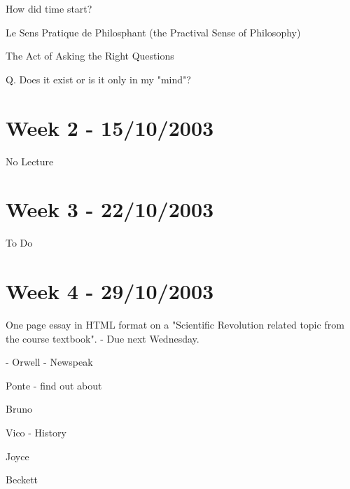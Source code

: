 \documentclass[a4paper,12pt]{article}
\begin{document}
\noindent How did time start?

\vspace{10mm}

\noindent Le Sens Pratique de Philosphant (the Practival Sense of Philosophy)

\vspace{10mm}

\noindent The Act of Asking the Right Questions

\vspace{15mm}

\noindent Q. Does it exist or is it only in my "mind"?

\section*{Week 2 - 15/10/2003}

No Lecture

\section*{Week 3 - 22/10/2003}

\noindent To Do

\section*{Week 4 - 29/10/2003}

\noindent One page essay in HTML format on a "Scientific Revolution related topic
from the course textbook". - Due next Wednesday.

\vspace{10mm}

 - Orwell - Newspeak

\vspace{10mm}

\noindent Ponte - find out about %

\vspace{5mm}

\noindent Bruno

\vspace{5mm}

\noindent Vico - History

\vspace{5mm}

\noindent Joyce

\vspace{5mm}

\noindent Beckett
\end{document}
